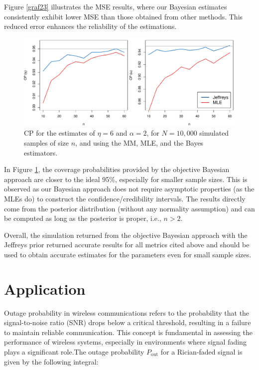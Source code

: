 \documentclass[12pt]{interact}
\theoremstyle{plain}%
\theoremstyle{definition}
\theoremstyle{remark}
\begin{document}
Figure \ref{graf23} illustrates the MSE results, where our Bayesian estimates consistently exhibit lower MSE than those obtained from other methods. This reduced error enhances the reliability of the estimations.
\begin{figure}[!h]
\centering
\includegraphics[scale=0.5]{fig3.pdf}
\caption{CP for the estimates of $\eta =6$ and $\alpha = 2$, for $N=10,000$ simulated samples of size $n$, and using the MM, MLE, and the Bayes estimators.}
\label{graf24}
\end{figure}

In Figure \ref{graf24}, the coverage probabilities provided by the objective Bayesian approach are closer to the ideal 95\%, especially for smaller sample sizes. This is observed as our Bayesian approach does not require asymptotic properties (as the MLEs do) to construct the confidence/credibility intervals. The results directly come from the posterior distribution (without any normality assumption) and can be computed as long as the posterior is proper, i.e., \(n > 2\).

Overall, the simulation returned from the objective Bayesian approach with the Jeffreys prior returned accurate results for all metrics cited above and should be used to obtain accurate estimates for the parameters even for small sample sizes.

\section{Application}

Outage probability in wireless communications refers to the probability that the signal-to-noise ratio (SNR) drops below a critical threshold, resulting in a failure to maintain reliable communication. This concept is fundamental in assessing the performance of wireless systems, especially in environments where signal fading plays a significant role.The outage probability \(P_{\text{out}}\) for a Rician-faded signal is given by the following integral:
\end{document}
